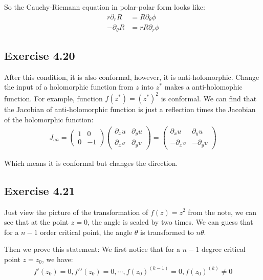 \documentclass[]{ctexart}
\newcommand{\pa}{\partial}
\begin{document}
				So the Cauchy-Riemann equation in polar-polar form looks like:
					\begin{equation*}
					\begin{aligned}
						r\pa_rR&=R\pa_{\theta}\phi\\
						-\pa_{\theta}R&=rR\pa_r\phi
					\end{aligned}
					\end{equation*}
		
	\subsection{Exercise 4.20}
		After this condition, it is also conformal, however, it is anti-holomorphic. Change the input of a holomorphic function from $z$ into $z^*$ makes a anti-holomophic function. For example, function $f(z^*)=(z^*)^2$ is conformal. We can find that the Jacobian of anti-holomorphic function is just a reflection times the Jacobian of the holomorphic function:
			\begin{equation*}
			\begin{aligned}
				J_{ah}=
				\begin{pmatrix}
					1 & 0\\
					0 & -1
				\end{pmatrix}
				\begin{pmatrix}
					\pa_xu & \pa _yu\\
					\pa_xv & \pa_yv
				\end{pmatrix}
				=
				\begin{pmatrix}
					\pa_xu & \pa _yu\\
					-\pa_xv & -\pa_yv
				\end{pmatrix}
			\end{aligned}
			\end{equation*}
				
		Which means it is conformal but changes the direction. 
			
	\subsection{Exercise 4.21}
		Just view the picture of the transformation of $f(z)=z^2$ from the note, we can see that at the point $z=0$, the angle is scaled by two times. We can guess that for a $n-1$ order critical point, the angle $\theta$ is transformed to $n\theta$. 
			
		Then we prove this statement: We first notice that for a $n-1$ degree critical point $z=z_0$, we have:
			\begin{equation*}
			\begin{aligned}
				f′(z_0)=0,f′′(z_0)=0,\cdots ,f(z_0)^{(k−1)}=0,f(z_0)^{(k)}\neq 0
			\end{aligned}
			\end{equation*}
			
\end{document}
